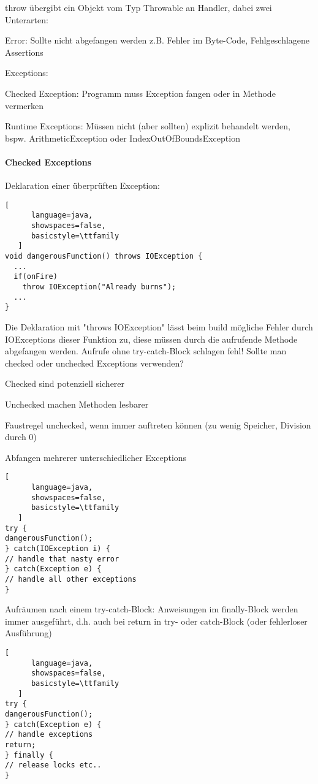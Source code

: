 \documentclass[10pt]{article}
\begin{document}
throw übergibt ein Objekt vom Typ Throwable an Handler, dabei zwei Unterarten:
\begin{itemize*}
  \item Error: Sollte nicht abgefangen werden z.B. Fehler im Byte-Code, Fehlgeschlagene Assertions
  \item Exceptions:
  \begin{itemize*}
    \item Checked Exception: Programm muss Exception fangen oder in Methode vermerken
    \item Runtime Exceptions: Müssen nicht (aber sollten) explizit behandelt werden, bspw. ArithmeticException oder IndexOutOfBoundsException
  \end{itemize*}
\end{itemize*}

\paragraph{Checked Exceptions}
Deklaration einer überprüften Exception:
\begin{lstlisting}[
      language=java,
      showspaces=false,
      basicstyle=\ttfamily
   ]
void dangerousFunction() throws IOException {
  ...
  if(onFire)
    throw IOException("Already burns");
  ...
}
\end{lstlisting}

Die Deklaration mit "throws IOException" lässt beim build mögliche Fehler durch IOExceptions dieser Funktion zu, diese müssen durch die aufrufende Methode abgefangen werden.
Aufrufe ohne try-catch-Block schlagen fehl!
Sollte man checked oder unchecked Exceptions verwenden?
\begin{itemize*}
  \item Checked sind potenziell sicherer
  \item Unchecked machen Methoden lesbarer
  \item Faustregel unchecked, wenn immer auftreten können (zu wenig Speicher, Division durch 0)
\end{itemize*}

Abfangen mehrerer unterschiedlicher Exceptions
\begin{lstlisting}[
      language=java,
      showspaces=false,
      basicstyle=\ttfamily
   ]
try {
dangerousFunction();
} catch(IOException i) {
// handle that nasty error
} catch(Exception e) {
// handle all other exceptions
}
\end{lstlisting}

Aufräumen nach einem try-catch-Block: Anweisungen im finally-Block werden immer ausgeführt, d.h. auch bei
return in try- oder catch-Block (oder fehlerloser Ausführung)
\begin{lstlisting}[
      language=java,
      showspaces=false,
      basicstyle=\ttfamily
   ]
try {
dangerousFunction();
} catch(Exception e) {
// handle exceptions
return;
} finally {
// release locks etc..
}
\end{lstlisting}
\end{document}
